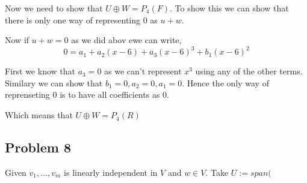 \documentclass[a4paper]{report}
\begin{document}
Now we need to show that  $ U \oplus W = P_4(F)$. To show this we can show that there is only one way of representing  $0$ as  $u + w$.

Now if  $u + w = 0$ as we did abov ewe can write,  
$$0 = a_1 + a_2(x-6) + a_3(x-6)^3 + b_1(x-6)^2$$

First we know that $a_3 = 0$ as we can't represent $x^3$ using any of the other terms. Similary we can show that $b_1 =0, a_2 = 0, a_1 = 0$. Hence the only way of reprenseting $0$ is to have all coefficients as 0.

Which means that $U \oplus W = P_4(R)$ 

\subsection*{Problem 8}
Given $v_1, \dots, v_m$ is linearly independent in $V$ and $w \in V$.
Take $U := span($
\end{document}
